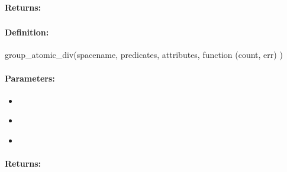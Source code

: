 \paragraph{Returns:}


\pagebreak
\subsubsection{}
\label{api:nodejs:group_atomic_div}


\paragraph{Definition:}
\begin{javascriptcode}
group_atomic_div(spacename, predicates, attributes, function (count, err) {})
\end{javascriptcode}
\paragraph{Parameters:}
\begin{itemize}[noitemsep]
\item {}\\

\item {}\\

\item {}\\

\end{itemize}

\paragraph{Returns:}


\pagebreak
\subsubsection{}
\label{api:nodejs:atomic_div}


